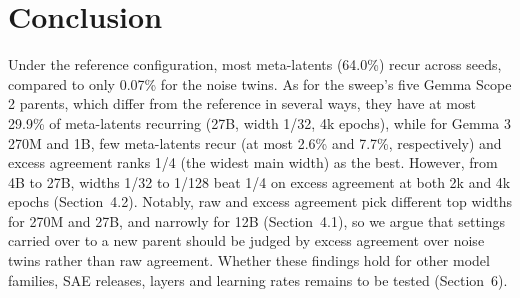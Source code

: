\section{Conclusion}

Under the reference configuration, most meta-latents (64.0\%) recur across seeds, compared to only 0.07\% for the noise twins.
As for the sweep's five Gemma Scope 2 parents, which differ from the reference in several ways, they have at most 29.9\% of meta-latents recurring (27B, width 1/32, 4k epochs), while for Gemma 3 270M and 1B, few meta-latents recur (at most 2.6\% and 7.7\%, respectively) and excess agreement ranks 1/4 (the widest main width) as the best.
However, from 4B to 27B, widths 1/32 to 1/128 beat 1/4 on excess agreement at both 2k and 4k epochs (Section~4.2).
Notably, raw and excess agreement pick different top widths for 270M and 27B, and narrowly for 12B (Section~4.1), so we argue that settings carried over to a new parent should be judged by excess agreement over noise twins rather than raw agreement.
Whether these findings hold for other model families, SAE releases, layers and learning rates remains to be tested (Section~6).
